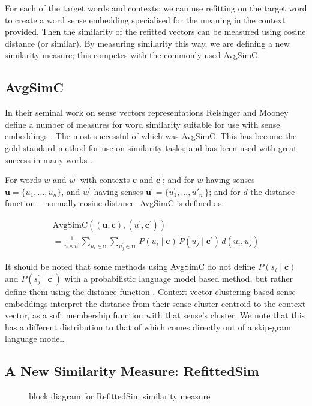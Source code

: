 \documentclass{sig-alternate}
\renewcommand{\c}{\mathbf{c}}
\renewcommand{\u}{\mathbf{u}}
\begin{document}
For each of the target words and contexts; we can use refitting on the target word to create a word sense embedding specialised for the meaning in the context provided. Then the similarity of the refitted vectors can be measured using cosine distance (or similar).
By measuring similarity this way, we are defining a new similarity measure; this competes with the commonly used AvgSimC.

\subsection{AvgSimC}
In their seminal work on sense vectors representations Reisinger and Mooney define a number of measures for word similarity suitable for use with sense embeddings \parencite{Reisinger2010}. The most successful of which was AvgSimC. This has become the gold standard method for use on similarity tasks; and has been used with great success in many works \cite{Huang2012, Chen2014, tian2014probabilistic}. 

For words $w$ and $w^\prime$ with contexts $\c$ and $\c^\prime$; and for $w$ having senses $\u=\{u_1,...,u_n\}$, and $w^\prime$ having senses $\u^\prime=\{u^\prime_1,...,u\prime_{n^\prime}\}$; and for $d$ the distance function -- normally cosine distance. AvgSimC is defined as:

\begin{multline} \label{eq:avgsimc}
\mathrm{AvgSimC}((\u,\c),(u^{\prime},\c^{\prime})) \\
=  \frac{1}{n \times n^{\prime}}
\sum_{u_{i}\in\u}
\sum_{u_{j}^{\prime}\in\u^{\prime}}
P(u_{i}\mid\c)\,P(u_{j}^{\prime}\mid\c^{\prime})\,d(u_{i},u_{j}^{\prime})
\end{multline}


It should be noted that some methods using AvgSimC  do not define  $P(s_{i}\mid\c)$ and $P(s_{j}^{\prime}\mid\c^\prime)$ with a probabilistic language model based method, but rather define them using the distance function \parencite{Reisinger2010, Huang2012}. Context-vector-clustering based sense embeddings interpret the distance from their sense cluster centroid to the context vector, as a soft membership function with that sense's cluster. We note that this has a different distribution to that of which comes directly out of a skip-gram language model.



\subsection{A New Similarity Measure: RefittedSim}\label{RefittedSimVsAvgSimC}
\begin{figure}
	\begin{adjustbox}{max width=\columnwidth}
	
	\end{adjustbox}
	\caption{ block diagram for RefittedSim similarity measure} \label{diaRefittedSim}
\end{figure}
\end{document}
